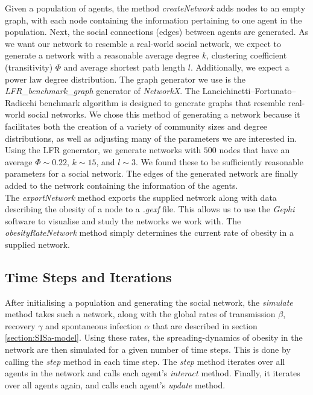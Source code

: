 \documentclass[11pt]{article}
\begin{document}
Given a population of agents, the method \textit{createNetwork} adds nodes to an empty graph, with each node containing the information pertaining to one agent in the population. Next, the social connections (edges) between agents are generated. As we want our network to resemble a real-world social network, we expect to generate a network with a reasonable average degree \(k\), clustering coefficient (transitivity) \(\Phi\) and average shortest path length \(l\). Additionally, we expect a power law degree distribution. The graph generator we use is the \textit{LFR\_benchmark\_graph} generator of \textit{NetworkX}.
The Lancichinetti–Fortunato–Radicchi benchmark algorithm is designed to generate graphs that resemble real-world social networks\cite{Lancichinetti_2008}. 
We chose this method of generating a network because it facilitates both the creation of a variety of community sizes and degree distributions, as well as adjusting many of the parameters we are interested in.
Using the LFR generator, we generate networks with \(500\) nodes that have an average \(\Phi \sim 0.22\), \(k \sim 15\), and \(l \sim 3\). We found these to be sufficiently reasonable parameters for a social network. The edges of the generated network are finally added to the network containing the information of the agents. \\

The \textit{exportNetwork} method exports the supplied network along with data describing the obesity of a node to a \textit{.gexf} file.
This allows us to use the \textit{Gephi} software to visualise and study the networks we work with. The \textit{obesityRateNetwork} method simply determines the current rate of obesity in a supplied network.

\subsection{Time Steps and Iterations} \label{section:iterations}

After initialising a population and generating the social network, the \textit{simulate} method takes such a network, along with the global rates of transmission \(\beta\), recovery \(\gamma\) and spontaneous infection \(\alpha\) that are described in section \ref{section:SISa-model}.
Using these rates,  the spreading-dynamics of obesity in the network are then simulated for a given number of time steps.
This is done by calling the \textit{step} method in each time step. The \textit{step} method iterates over all agents in the network and calls each agent's \textit{interact} method. Finally, it iterates over all agents again, and calls each agent's \textit{update} method. \\
\end{document}
